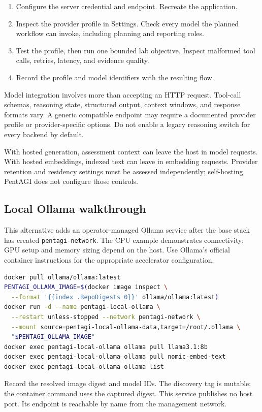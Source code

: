 \documentclass[11pt,letterpaper]{article}
\newcommand{\code}[1]{\nolinkurl{#1}}
\newcommand{\src}[1]{\cite{#1}}
\newcommand{\smallhead}[1]{\par\medskip{\sffamily\bfseries\color{Navy}#1}\par}
\begin{document}
\begin{enumerate}
\item Configure the server credential and endpoint. Recreate the application.
\item Inspect the provider profile in Settings. Check every model the planned
workflow can invoke, including planning and reporting roles.
\item Test the profile, then run one bounded lab objective. Inspect malformed
tool calls, retries, latency, and evidence quality.
\item Record the profile and model identifiers with the resulting flow.
\end{enumerate}

Model integration involves more than accepting an HTTP request. Tool-call
schemas, reasoning state, structured output, context windows, and response
formats vary. A generic compatible endpoint may require a documented provider
profile or provider-specific options. Do not enable a legacy reasoning switch
for every backend by default. \src{llms}

\smallhead{Data and cost boundary}
With hosted generation, assessment context can leave the host in model
requests. With hosted embeddings, indexed text can leave in embedding requests.
Provider retention and residency settings must be assessed independently;
self-hosting PentAGI does not configure those controls. \src{openai-data}

\clearpage
\subsection{Local Ollama walkthrough}
This alternative adds an operator-managed Ollama service after the base stack
has created \code{pentagi-network}. The CPU example demonstrates connectivity;
GPU setup and memory sizing depend on the host. Use Ollama's official container
instructions for the appropriate accelerator configuration. \src{ollama-docker}

\begin{lstlisting}[language=bash]
docker pull ollama/ollama:latest
PENTAGI_OLLAMA_IMAGE=$(docker image inspect \
  --format '{{index .RepoDigests 0}}' ollama/ollama:latest)
docker run -d --name pentagi-local-ollama \
  --restart unless-stopped --network pentagi-network \
  --mount source=pentagi-local-ollama-data,target=/root/.ollama \
  "$PENTAGI_OLLAMA_IMAGE"
docker exec pentagi-local-ollama ollama pull llama3.1:8b
docker exec pentagi-local-ollama ollama pull nomic-embed-text
docker exec pentagi-local-ollama ollama list
\end{lstlisting}
Record the resolved image digest and model IDs. The discovery tag is mutable;
the container command uses the captured digest. This service publishes no host
port. Its endpoint is reachable by name from the management network.
\end{document}
